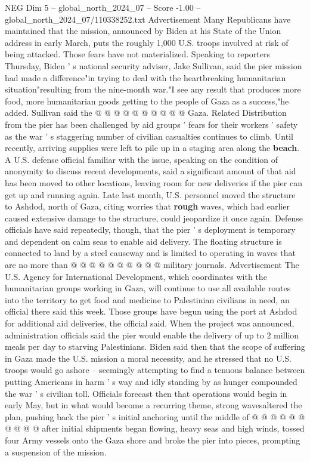 \begin{textsample}{NEG Dim 5 – global\_north\_2024\_07 – Score -1.00 – global\_north\_2024\_07/110338252.txt}
Advertisement Many Republicans have maintained that the mission, announced by Biden at his State of the Union address in early March, puts the roughly 1,000 U.S. troops involved at risk of being attacked.
Those fears have not materialized.
Speaking to reporters Thursday, Biden ' s national security adviser, Jake Sullivan, said the pier mission had made a difference"in trying to deal with the heartbreaking humanitarian situation"resulting from the nine-month war."I see any result that produces more food, more humanitarian goods getting to the people of Gaza as a success,"he added.
Sullivan said the @ @ @ @ @ @ @ @ @ @ Gaza.
Related Distribution from the pier has been challenged by aid groups ' fears for their workers ' safety as the war ' s staggering number of civilian casualties continues to climb.
Until recently, arriving supplies were left to pile up in a staging area along the \textbf{beach}.
A U.S. defense official familiar with the issue, speaking on the condition of anonymity to discuss recent developments, said a significant amount of that aid has been moved to other locations, leaving room for new deliveries if the pier can get up and running again.
Late last month, U.S. personnel moved the structure to Ashdod, north of Gaza, citing worries that \textbf{rough} waves, which had earlier caused extensive damage to the structure, could jeopardize it once again.
Defense officials have said repeatedly, though, that the pier ' s deployment is temporary and dependent on calm seas to enable aid delivery.
The floating structure is connected to land by a steel causeway and is limited to operating in waves that are no more than @ @ @ @ @ @ @ @ @ @ military journals.
Advertisement The U.S.
Agency for International Development, which coordinates with the humanitarian groups working in Gaza, will continue to use all available routes into the territory to get food and medicine to Palestinian civilians in need, an official there said this week.
Those groups have begun using the port at Ashdod for additional aid deliveries, the official said.
When the project was announced, administration officials said the pier would enable the delivery of up to 2 million meals per day to starving Palestinians.
Biden said then that the scope of suffering in Gaza made the U.S. mission a moral necessity, and he stressed that no U.S. troops would go ashore -- seemingly attempting to find a tenuous balance between putting Americans in harm ' s way and idly standing by as hunger compounded the war ' s civilian toll.
Officials forecast then that operations would begin in early May, but in what would become a recurring theme, strong wavesaltered the plan, pushing back the pier ' s initial anchoring until the middle of @ @ @ @ @ @ @ @ @ @ after initial shipments began flowing, heavy seas and high winds, tossed four Army vessels onto the Gaza shore and broke the pier into pieces, prompting a suspension of the mission.

\end{textsample}

